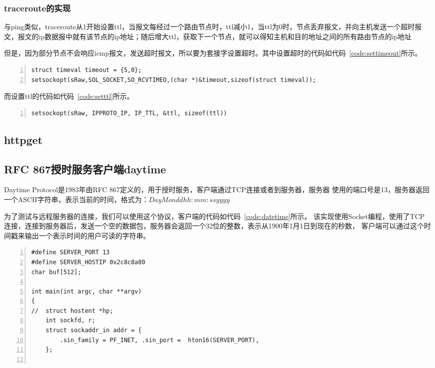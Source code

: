 \documentclass[a4paper,twoside]{ctexrep}
\begin{document}
\begin{spacing}{1.2}
\subsubsection{traceroute的实现}

与ping类似，traceroute从1开始设置ttl，当报文每经过一个路由节点时，ttl减小1，当ttl为0时，节点丢弃报文，并向主机发送一个超时报文，报文的ip数据报中就有该节点的ip地址；随后增大ttl，获取下一个节点，就可以得知主机和目的地址之间的所有路由节点的ip地址

但是，因为部分节点不会响应icmp报文，发送超时报文，所以要为套接字设置超时。其中设置超时的代码如代码~\ref{code:settimeout}所示。
\begin{lstlisting}[numbers=left,style=CppStyle,caption={设置超时},label={code:settimeout}]
struct timeval timeout = {5,0};
setsockopt(sRaw,SOL_SOCKET,SO_RCVTIMEO,(char *)&timeout,sizeof(struct timeval));
\end{lstlisting}
而设置ttl的代码如代码~\ref{code:setttl}所示。
\begin{lstlisting}[numbers=left,style=CppStyle,caption={设置TTL},label={code:setttl}]
	setsockopt(sRaw, IPPROTO_IP, IP_TTL, &ttl, sizeof(ttl))
\end{lstlisting}

\subsection{httpget}

\subsection{RFC 867授时服务客户端daytime}

Daytime Protocol是1983年由RFC 867定义的，用于授时服务，客户端通过TCP连接或者到服务器，服务器
使用的端口号是13，服务器返回一个ASCII字符串，表示当前的时间，格式为：$Day Mon dd hh:mm:ss yyyy$

为了测试与远程服务器的连接，我们可以使用这个协议，客户端的代码如代码~\ref{code:datetime}所示。
该实现使用Socket编程，使用了TCP连接，连接到服务器后，发送一个空的数据包，服务器会返回一个32位的整数，表示从1900年1月1日到现在的秒数，
客户端可以通过这个时间戳来输出一个表示时间的用户可读的字符串。

\begin{lstlisting}[numbers=left,style=CppStyle,caption={daytime客户端},label={code:datetime}]
#define SERVER_PORT 13
#define SERVER_HOSTIP 0x2c8c8a80
char buf[512];

int main(int argc, char **argv)
{
//	struct hostent *hp;
	int sockfd, r;
	struct sockaddr_in addr = {
		.sin_family = PF_INET, .sin_port =  hton16(SERVER_PORT),
	};


\end{lstlisting}
\end{spacing}
\end{document}
